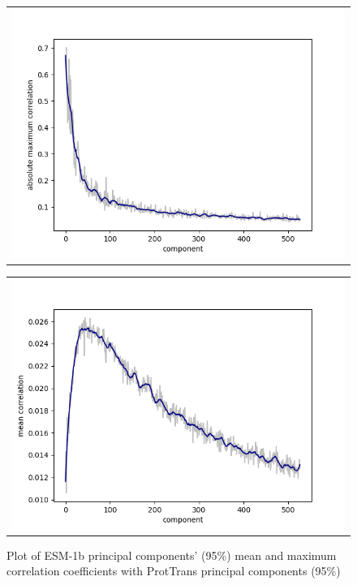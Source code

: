 \documentclass[12pt]{article}
\begin{document}
	\begin{figure}
		\centering
		\begin{tabular}{@{}c@{}}
			\includegraphics[scale=0.85]{validation_small_set_2_joined_PC_95_correlation_max.png}
		\end{tabular}

		\begin{tabular}{@{}c@{}}
			\includegraphics[scale=0.85]{validation_small_set_2_joined_PC_95_correlation_mean.png}
		\end{tabular}
		
		\caption{Plot of ESM-1b principal components' (95\%) mean and maximum correlation 
		coefficients with ProtTrans principal components (95\%)}
		\label{figure:correlationComponentsMaxAndMeanPC95}
	\end{figure}
\end{document}

